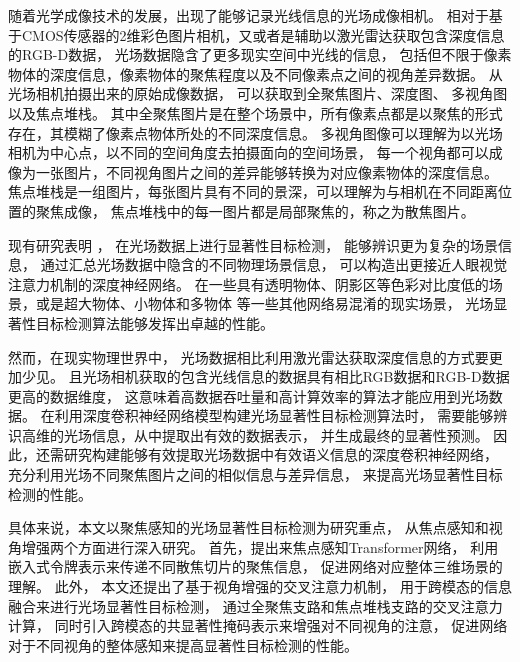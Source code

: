随着光学成像技术的发展，出现了能够记录光线信息的光场成像相机。
相对于基于CMOS传感器的2维彩色图片相机，又或者是辅助以激光雷达获取包含深度信息的RGB-D数据，
光场数据隐含了更多现实空间中光线的信息，
包括但不限于像素物体的深度信息，像素物体的聚焦程度以及不同像素点之间的视角差异数据。
从光场相机拍摄出来的原始成像数据，
可以获取到全聚焦图片、深度图、
多视角图以及焦点堆栈。
其中全聚焦图片是在整个场景中，所有像素点都是以聚焦的形式存在，其模糊了像素点物体所处的不同深度信息。
多视角图像可以理解为以光场相机为中心点，以不同的空间角度去拍摄面向的空间场景，
每一个视角都可以成像为一张图片，不同视角图片之间的差异能够转换为对应像素物体的深度信息。
焦点堆栈是一组图片，每张图片具有不同的景深，可以理解为与相机在不同距离位置的聚焦成像，
焦点堆栈中的每一图片都是局部聚焦的，称之为散焦图片。





现有研究表明
，
在光场数据上进行显著性目标检测，
能够辨识更为复杂的场景信息，
通过汇总光场数据中隐含的不同物理场景信息，
可以构造出更接近人眼视觉注意力机制的深度神经网络。
在一些具有透明物体、阴影区等色彩对比度低的场景，或是超大物体、小物体和多物体
等一些其他网络易混淆的现实场景，
光场显著性目标检测算法能够发挥出卓越的性能。


然而，在现实物理世界中，
光场数据相比利用激光雷达获取深度信息的方式要更加少见。
且光场相机获取的包含光线信息的数据具有相比RGB数据和RGB-D数据更高的数据维度，
这意味着高数据吞吐量和高计算效率的算法才能应用到光场数据。
在利用深度卷积神经网络模型构建光场显著性目标检测算法时，
需要能够辨识高维的光场信息，从中提取出有效的数据表示，
并生成最终的显著性预测。
因此，还需研究构建能够有效提取光场数据中有效语义信息的深度卷积神经网络，
充分利用光场不同聚焦图片之间的相似信息与差异信息，
来提高光场显著性目标检测的性能。






具体来说，本文以聚焦感知的光场显著性目标检测为研究重点，
从焦点感知和视角增强两个方面进行深入研究。
首先，提出来焦点感知Transformer网络，
利用嵌入式令牌表示来传递不同散焦切片的聚焦信息，
促进网络对应整体三维场景的理解。
此外，
本文还提出了基于视角增强的交叉注意力机制，
用于跨模态的信息融合来进行光场显著性目标检测，
通过全聚焦支路和焦点堆栈支路的交叉注意力计算，
同时引入跨模态的共显著性掩码表示来增强对不同视角的注意，
促进网络对于不同视角的整体感知来提高显著性目标检测的性能。





